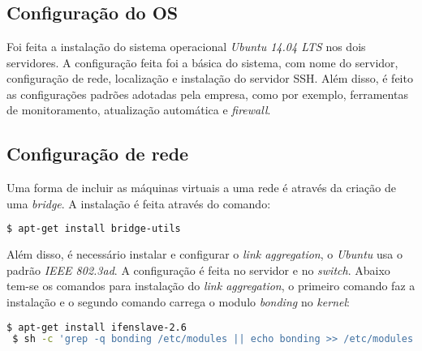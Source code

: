 
\chapter{}
\label{cap:apconfiguracao}

\section{Configuração do \ac{OS}}
\label{ap:confos}

Foi feita a instalação do sistema operacional \textit{Ubuntu 14.04 \ac{LTS}} nos dois servidores. A configuração feita foi a básica do sistema,
com nome do servidor, configuração de rede, localização e instalação do servidor \ac{SSH}.
Além disso, é feito as configurações padrões adotadas pela empresa, como por exemplo, ferramentas de monitoramento, atualização automática
e \textit{firewall}.

\section{Configuração de rede}
\label{ap:confrede}

Uma forma de incluir as máquinas virtuais a uma rede é através da criação de uma \textit{bridge}. A instalação é feita através do comando:
\begin{lstlisting}[language=bash]
  $ apt-get install bridge-utils
\end{lstlisting}

Além disso, é necessário instalar e configurar o \textit{link aggregation}, o \textit{Ubuntu} usa o padrão \textit{IEEE 802.3ad}. A configuração 
é feita no servidor e no \textit{switch}. Abaixo tem-se os comandos para instalação do \textit{link aggregation}, o primeiro comando faz a 
instalação e o segundo comando carrega o modulo \textit{bonding} no \textit{kernel}:
\begin{lstlisting}[language=bash]
 $ apt-get install ifenslave-2.6
 $ sh -c 'grep -q bonding /etc/modules || echo bonding >> /etc/modules'
\end{lstlisting}

